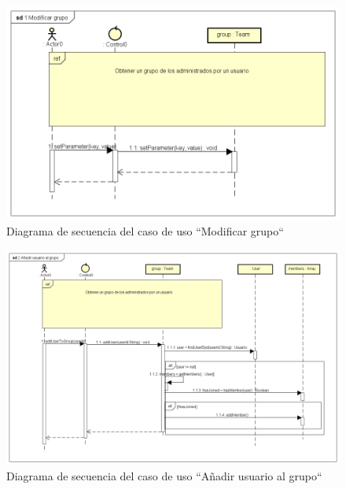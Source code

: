 \documentclass[twoside]{report}
\begin{document}
\begin{figure}[H]
\includegraphics[scale=0.5]{images/sequence/ModifyGroup}
\caption{Diagrama de secuencia del caso de uso “Modificar grupo“}
\end{figure}

\begin{figure}[H]
\includegraphics[scale=0.5]{images/sequence/AddUserToGroup}
\caption{Diagrama de secuencia del caso de uso “A\~{n}adir usuario al grupo“}
\end{figure}
\end{document}
